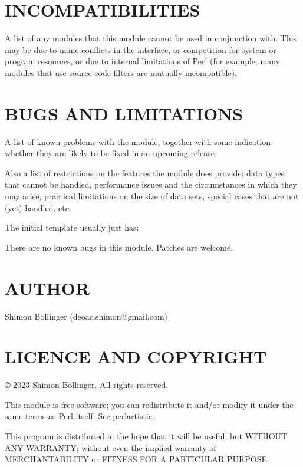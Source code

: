 \documentclass{scrartcl}
\begin{document}
\section{INCOMPATIBILITIES}

A list of any modules that this module cannot be used in conjunction with.
This may be due to name conflicts in the interface, or competition for
system or program resources, or due to internal limitations of Perl (for
example, many modules that use source code filters are mutually
incompatible).

\section{BUGS AND LIMITATIONS}

A list of known problems with the module, together with some indication
whether they are likely to be fixed in an upcoming release.

Also a list of restrictions on the features the module does provide: data
types that cannot be handled, performance issues and the circumstances in
which they may arise, practical limitations on the size of data sets,
special cases that are not (yet) handled, etc.

The initial template usually just has:

There are no known bugs in this module. Patches are welcome.

\section{AUTHOR}

Shimon Bollinger (deoac.shimon@gmail.com)

\section{LICENCE AND COPYRIGHT}

© 2023 Shimon Bollinger. All rights reserved.

This module is free software; you can redistribute it and/or modify it
under the same terms as Perl itself. See
\href{http://perldoc.perl.org/perlartistic.html}{perlartistic}.

This program is distributed in the hope that it will be useful, but WITHOUT
ANY WARRANTY; without even the implied warranty of MERCHANTABILITY or
FITNESS FOR A PARTICULAR PURPOSE.
\end{document}
